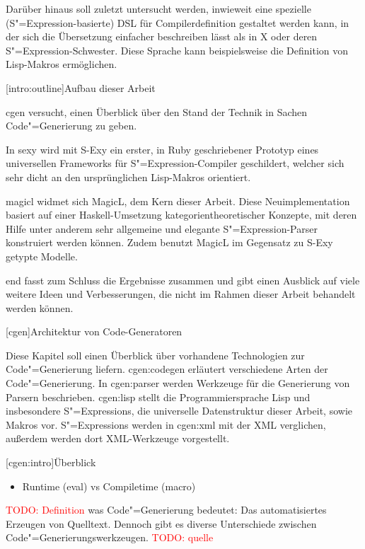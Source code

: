 \documentclass[a4paper, bibgerm]{book}
\newcommand{\todo}[1]{
  \textcolor{red}{TODO: #1}
}
\newcommand\lchapter{}
\newcommand\lsection{}
\newcommand\cref{}
\newcommand\sref{}
\newcommand{\sexy}{S-Exy}
\newcommand{\sexp}{S"=Expression}
\newcommand{\sexps}{S"=Expressions}
\newcommand{\cgen}{Code"=Generierung}
\begin{document}
Darüber hinaus soll zuletzt untersucht werden, inwieweit eine spezielle
(\sexp{}-basierte) DSL für Compilerdefinition gestaltet werden kann, in
der sich die Übersetzung einfacher beschreiben lässt als in X
oder deren \sexp{}-Schwester. Diese Sprache kann beispielsweise die
Definition von Lisp-Makros ermöglichen.

\lsection[intro:outline]{Aufbau dieser Arbeit}

\cref{cgen} versucht, einen Überblick über den Stand der Technik in
Sachen \cgen{} zu geben.

In \cref{sexy} wird mit \sexy{} ein erster, in Ruby geschriebener Prototyp eines
universellen Frameworks für \sexp{}-Compiler geschildert, welcher
sich sehr dicht an den ursprünglichen Lisp-Makros
orientiert.

\cref{magicl} widmet sich MagicL, dem Kern dieser Arbeit. Diese
Neuimplementation basiert auf einer Haskell-Umsetzung
kategorientheoretischer Konzepte, mit deren Hilfe unter anderem sehr
allgemeine und elegante \sexp{}-Parser konstruiert werden
können. Zudem benutzt MagicL im Gegensatz zu \sexy{} getypte Modelle.

\cref{end} fasst zum Schluss die Ergebnisse zusammen und gibt
einen Ausblick auf viele weitere Ideen und Verbesserungen, die nicht im
Rahmen dieser Arbeit behandelt werden können.

\lchapter[cgen]{Architektur von Code-Generatoren}

Diese Kapitel soll einen Überblick über vorhandene Technologien zur
\cgen{} liefern.  \sref{cgen:codegen} erläutert verschiedene
Arten der \cgen{}. In \sref{cgen:parser} werden Werkzeuge für
die Generierung von Parsern beschrieben. \sref{cgen:lisp} stellt die
Programmiersprache Lisp und insbesondere \sexps{}, die universelle
Datenstruktur dieser Arbeit, sowie Makros vor. \sexps{} werden in
\sref{cgen:xml} mit der XML verglichen, außerdem werden dort
XML-Werkzeuge vorgestellt. 

\lsection[cgen:intro]{Überblick}

\begin{itemize}
\item Runtime (eval) vs Compiletime (macro)
\end{itemize}

\todo{Definition} was \cgen{} bedeutet:
Das automatisiertes Erzeugen von Quelltext. Dennoch gibt es diverse
Unterschiede zwischen \cgen{}swerkzeugen. \todo{quelle}
\end{document}
